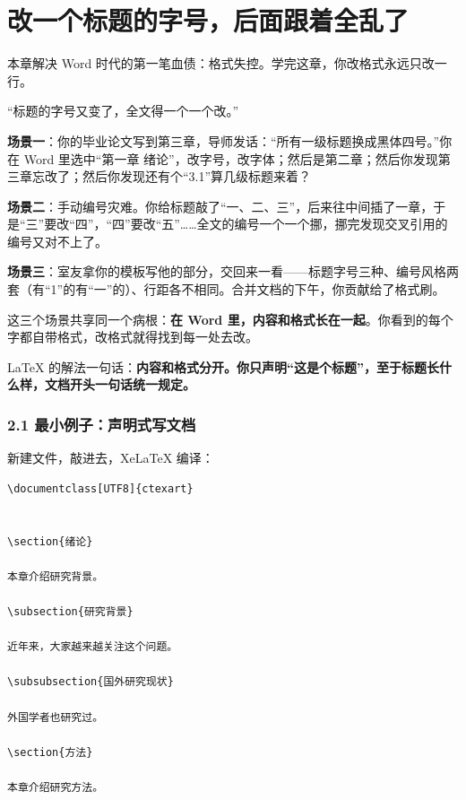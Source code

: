 \chapter{改一个标题的字号，后面跟着全乱了}

\begin{notebox}
本章解决 Word 时代的第一笔血债：格式失控。学完这章，你改格式永远只改一行。
\end{notebox}


“标题的字号又变了，全文得一个一个改。”


\textbf{场景一}：你的毕业论文写到第三章，导师发话：“所有一级标题换成黑体四号。”你在 Word 里选中“第一章 绪论”，改字号，改字体；然后是第二章；然后你发现第三章忘改了；然后你发现还有个“3.1”算几级标题来着？

\textbf{场景二}：手动编号灾难。你给标题敲了“一、二、三”，后来往中间插了一章，于是“三”要改“四”，“四”要改“五”……全文的编号一个一个挪，挪完发现交叉引用的编号又对不上了。

\textbf{场景三}：室友拿你的模板写他的部分，交回来一看——标题字号三种、编号风格两套（有“1”的有“一”的）、行距各不相同。合并文档的下午，你贡献给了格式刷。

这三个场景共享同一个病根：\textbf{在 Word 里，内容和格式长在一起}。你看到的每个字都自带格式，改格式就得找到每一处去改。

LaTeX 的解法一句话：\textbf{内容和格式分开。你只声明“这是个标题”，至于标题长什么样，文档开头一句话统一规定。}


\subsection*{2.1 最小例子：声明式写文档}

新建文件，敲进去，XeLaTeX 编译：

\begin{lstlisting}
\documentclass[UTF8]{ctexart}


\section{绪论}

本章介绍研究背景。

\subsection{研究背景}

近年来，大家越来越关注这个问题。

\subsubsection{国外研究现状}

外国学者也研究过。

\section{方法}

本章介绍研究方法。


\end{lstlisting}

